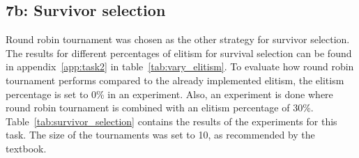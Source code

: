 \documentclass{report}
\begin{document}
\begin{table}[H]
	\centering
	\caption{Results when using Fitness Proportional Selection as parent selection method.}
	\label{tab:selparentfitprop}
\end{table}

\subsection{7b: Survivor selection}
Round robin tournament was chosen as the other strategy for survivor selection. The results for different percentages of elitism for survival selection can be found in appendix~\ref{app:task2} in table~\ref{tab:vary_elitism}. To evaluate how round robin tournament performs compared to the already implemented elitism, the elitism percentage is set to 0\% in an experiment. Also, an experiment is done where round robin tournament is combined with an elitism percentage of 30\%. Table~\ref{tab:survivor_selection} contains the results of the experiments for this task. The size of the tournaments was set to 10, as recommended by the textbook.
\end{document}
